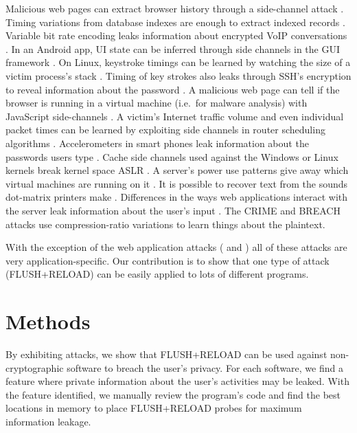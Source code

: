 \documentclass{acm_proc_article-sp}
\begin{document}
Malicious web pages can extract browser history through a side-channel attack
\cite{weinberg2011still}. Timing variations from database indexes are enough to
extract indexed records \cite{futoransky2007nd2db}. Variable bit rate encoding
leaks information about encrypted VoIP conversations
\cite{white2011phonotactic}. In an Android app, UI state can be inferred through
side channels in the GUI framework \cite{chen2014peeking}. On Linux, keystroke
timings can be learned by watching the size of a victim process's stack
\cite{zhang2009peeping}. Timing of key strokes also leaks through SSH's
encryption to reveal information about the password \cite{song2001timing}.
A malicious web page can tell if the browser is running in a virtual machine
(i.e.\ for malware analysis) with JavaScript side-channels \cite{ho2014tick}.
A victim's Internet traffic volume and even individual packet times can be
learned by exploiting side channels in router scheduling algorithms
\cite{kadloor2010low}. Accelerometers in smart phones leak information about the
passwords users type \cite{owusu2012accessory} \cite{cai2012practicality}. Cache
side channels used against the Windows or Linux kernels break kernel space ASLR
\cite{hund2013practical}. A server's power use patterns give away which virtual
machines are running on it \cite{hlavacs2011energy}. It is possible to recover
text from the sounds dot-matrix printers make \cite{backes2010acoustic}.
Differences in the ways web applications interact with the server leak
information about the user's input \cite{bortz2007exposing} \cite{chen2010side}.
The CRIME \cite{duong2012crime} and BREACH \cite{gluck2013breach} attacks use
compression-ratio variations to learn things about the plaintext.

With the exception of the web application attacks (\cite{bortz2007exposing} and
\cite{chen2014peeking}) all of these attacks are very application-specific. Our
contribution is to show that one type of attack (FLUSH+RELOAD) can be easily
applied to lots of different programs.

\section{Methods}
\label{sec:methods}


By exhibiting attacks, we show that FLUSH+RELOAD can be used against
non-cryptographic software to breach the user's privacy. For each software, we
find a feature where private information about the user's activities may be
leaked. With the feature identified, we manually review the program's code and
find the best locations in memory to place FLUSH+RELOAD probes for maximum
information leakage.
\end{document}
